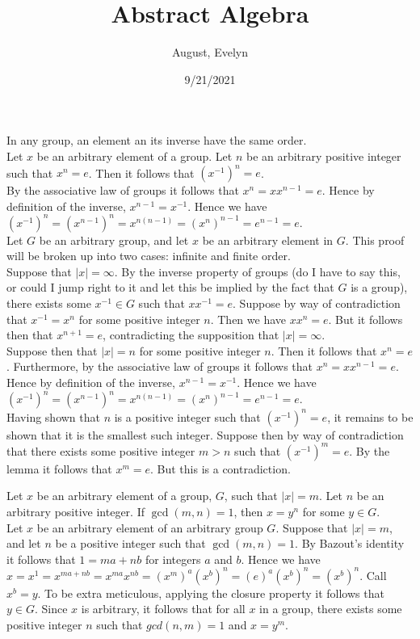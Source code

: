 \documentclass{article}
\title{Abstract Algebra}
\author{August, Evelyn}
\date{9/21/2021}
\begin{document}
 In any group, an element an its inverse have the same order.\\

 Let $x$ be an arbitrary element of a group. Let $n$ be an arbitrary positive integer such that $x^n = e$. Then it follows that $(x^{-1})^n = e$.\\

By the associative law of groups it follows that $x^n = xx^{n-1} = e$. Hence by definition of the inverse, $x^{n-1} = x^{-1}.$ Hence we have $(x^{-1})^n = (x^{n-1})^n = x^{n(n-1)} = (x^n)^{n-1} = e^{n-1} = e.$\\


 Let $G$ be an arbitrary group, and let $x$ be an arbitrary element in $G$. This proof will be broken up into two cases: infinite and finite order.\\

Suppose that $|x| = \infty$. By the inverse property of groups (do I have to say this, or could I jump right to it and let this be implied by the fact that $G$ is a group), there exists some $x^{-1}\in G$ such that $xx^{-1} = e$. Suppose by way of contradiction that $x^{-1} = x^n$ for some positive integer $n$. Then we have $xx^n = e$. But it follows then that $x^{n+1} = e$, contradicting the supposition that $|x| = \infty.$\\

Suppose then that $|x| = n$ for some positive integer $n$. Then it follows that $x^n = e$. Furthermore, by the associative law of groups it follows that $x^n = xx^{n-1} = e$. Hence by definition of the inverse, $x^{n-1} = x^{-1}.$ Hence we have $(x^{-1})^n = (x^{n-1})^n = x^{n(n-1)} = (x^n)^{n-1} = e^{n-1} = e.$ \\

Having shown that $n$ is a positive integer such that $(x^{-1})^n = e$, it remains to be shown that it is the smallest such integer. Suppose then by way of contradiction that there exists some positive integer $m > n$ such that $(x^{-1})^m = e$. By the lemma it follows that $x^m = e$. But this is a contradiction.\\

\vspace{.5cm}

 Let $x$ be an arbitrary element of a group, $G$, such that $|x| = m$. Let $n$ be an arbitrary positive integer. If $\gcd(m,n) =1$, then $x = y^n$ for some $y\in G.$\\
Let $x$ be an arbitrary element of an arbitrary group $G.$ Suppose that $|x| = m$, and let $n$ be a positive integer such that $\gcd(m,n) = 1$. By Bazout's identity it follows that $1 = ma + nb$ for integers $a$ and $b$. Hence we have $x  = x^1= x^{ma + nb} = x^{ma}x^{nb} = (x^{m})^a (x^{b})^n = (e)^a (x^{b})^n = (x^b)^n$. Call $x^b = y$. To be extra meticulous, applying the closure property it follows that $y \in G$. Since $x$ is arbitrary, it follows that for all $x$ in a group, there exists some positive integer $n$ such that $gcd(n,m)=1$ and $x=y^m$.\\
\end{document}
